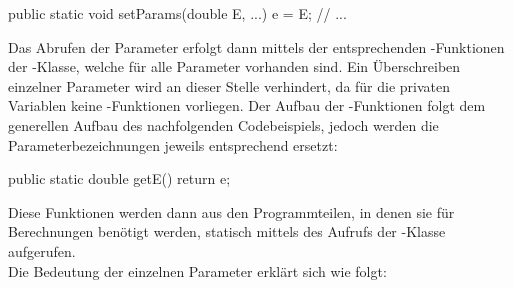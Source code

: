 \begin{code} 
	public static void setParams(double E, ...){
		e = E;
		// ...
	}
\end{code}

Das Abrufen der Parameter erfolgt dann mittels der entsprechenden -Funktionen der -Klasse, welche für alle Parameter vorhanden sind.
Ein Überschreiben einzelner Parameter wird an dieser Stelle verhindert, da für die privaten Variablen keine -Funktionen vorliegen.
Der Aufbau der -Funktionen folgt dem generellen Aufbau des nachfolgenden Codebeispiels, jedoch werden die Parameterbezeichnungen jeweils entsprechend ersetzt:\\

\begin{code} 
public static double getE() {
	return e;
}
\end{code}

Diese Funktionen werden dann aus den Programmteilen, in denen sie für Berechnungen benötigt werden, statisch mittels des Aufrufs der -Klasse aufgerufen. \\
Die Bedeutung der einzelnen Parameter erklärt sich wie folgt:

